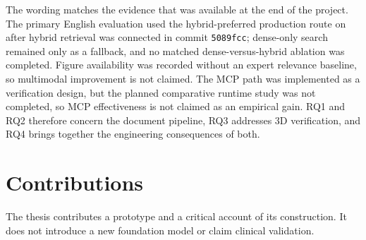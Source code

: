 The wording matches the evidence that was available at the end of the project. The primary English evaluation used the hybrid-preferred production route on  after hybrid retrieval was connected in commit \texttt{5089fcc}; dense-only search remained only as a fallback, and no matched dense-versus-hybrid ablation was completed. Figure availability was recorded without an expert relevance baseline, so multimodal improvement is not claimed. The MCP path was implemented as a verification design, but the planned comparative runtime study was not completed, so MCP effectiveness is not claimed as an empirical gain. RQ1 and RQ2 therefore concern the document pipeline, RQ3 addresses 3D verification, and RQ4 brings together the engineering consequences of both.

\section{Contributions}
\label{sec:introduction-contributions}

The thesis contributes a prototype and a critical account of its construction. It does not introduce a new foundation model or claim clinical validation.

